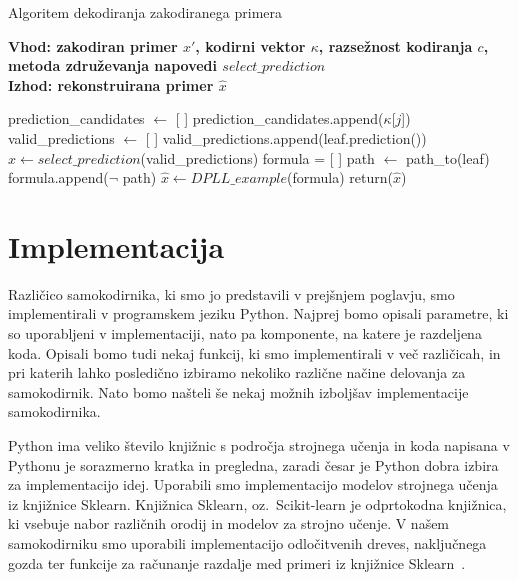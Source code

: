 \documentclass[12pt,a4paper,twoside]{article}
\theoremstyle{definition} %
\theoremstyle{plain} %
\numberwithin{equation}{section}  %
\begin{document}
\begin{algorithm}[h!]
	\caption{Algoritem dekodiranja zakodiranega primera}
	\label{algoritem-decode}
	\raggedright
	\textbf{Vhod: zakodiran primer $x'$, kodirni vektor $\kappa$, razsežnost kodiranja $c$, metoda združevanja napovedi $select\_prediction$}  \\
	\textbf{Izhod: rekonstruirana primer $\hat{x}$} 
	\begin{algorithmic}[0]
			\State prediction\_candidates $\gets$ [ ]
				\State prediction\_candidates.append($\kappa$[$j$])
			\EndIf
		\EndFor
			\State valid\_predictions $\gets$ [ ]
				\State valid\_predictions.append(leaf.prediction())
			\EndFor
			\State $\hat{x} \gets select\_prediction$(valid\_predictions) 
		\Else
			\State formula = [ ]
				\State path $\gets$ path\_to(leaf)
				\State formula.append($\lnot$ path)
			\EndFor
			\State $\hat{x} \gets DPLL\_example$(formula)
		\EndIf
		\State return($\hat{x}$)
	\end{algorithmic}
\end{algorithm}



\section{Implementacija}
\label{pogl:implementacija}

Različico samokodirnika, ki smo jo predstavili v prejšnjem poglavju, smo implementirali v programskem jeziku Python.
Najprej bomo opisali parametre, ki so uporabljeni v implementaciji, nato pa komponente, na katere je razdeljena koda.
Opisali bomo tudi nekaj funkcij, ki smo implementirali v več različicah, in pri katerih lahko posledično izbiramo nekoliko različne načine delovanja za samokodirnik.
Nato bomo našteli še nekaj možnih izboljšav implementacije samokodirnika.

Python ima veliko število knjižnic s področja strojnega učenja in koda napisana v Pythonu je sorazmerno kratka in pregledna, zaradi česar je Python dobra izbira za implementacijo idej.
Uporabili smo implementacijo modelov strojnega učenja iz knjižnice Sklearn.
Knjižnica Sklearn, oz.\ Scikit-learn je odprtokodna knjižnica, ki vsebuje nabor različnih orodij in modelov za strojno učenje.
V našem samokodirniku smo uporabili implementacijo odločitvenih dreves, naključnega gozda ter funkcije za računanje razdalje med primeri iz knjižnice Sklearn~\cite{scikit-learn}.
\end{document}
